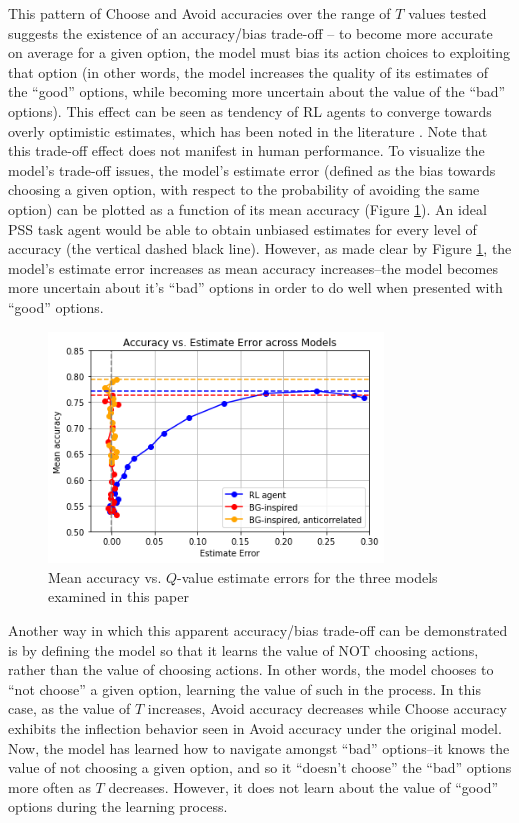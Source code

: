 \documentclass[10pt,letterpaper]{article}
\begin{document}
This pattern of Choose and Avoid accuracies over the range of $T$ values tested suggests the existence of an accuracy/bias trade-off -- to become more accurate on average for a given option, the model must bias its action choices to exploiting that option (in other words, the model increases the quality of its estimates of the ``good'' options, while becoming more uncertain about the value of the ``bad'' options). This effect can be seen as tendency of RL agents to converge towards overly optimistic estimates, which has been noted in the literature \cite{hasselt2010double}. Note that this trade-off effect does not manifest in human performance. To visualize the model's trade-off issues, the model's estimate error (defined as the bias towards choosing a given option, with respect to the probability of avoiding the same option) can be plotted as a function of its mean accuracy (Figure \ref{roc}). An ideal PSS task agent would be able to obtain unbiased estimates for every level of accuracy (the vertical dashed black line). However, as made clear by Figure \ref{roc}, the model's estimate error increases as mean accuracy increases--the model becomes more uncertain about it’s ``bad'' options in order to do well when presented with ``good'' options.

\begin{figure}[ht]
	\begin{center}
		\includegraphics[width=3.5in]{roc-agents.png}
	\end{center}
	\caption{Mean accuracy vs. $Q$-value estimate errors for the three models examined in this paper} 
	\label{roc}
\end{figure}

Another way in which this apparent accuracy/bias trade-off can be demonstrated is by defining the model so that it learns the value of NOT choosing actions, rather than the value of choosing actions. In other words, the model chooses to ``not choose'' a given option, learning the value of such in the process. In this case, as the value of $T$ increases, Avoid accuracy decreases while Choose accuracy exhibits the inflection behavior seen in Avoid accuracy under the original model. Now, the model has learned how to navigate amongst ``bad'' options--it knows the value of not choosing a given option, and so it ``doesn't choose'' the ``bad'' options more often as $T$  decreases. However, it does not learn about the value of ``good'' options during the learning process.
\end{document}
